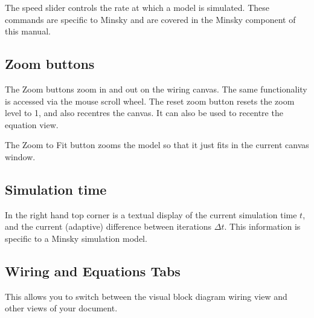 \begin{center}
\end{center}

The speed slider controls the rate at which a model is simulated. These commands are specific to Minsky and are covered in the Minsky component of this manual.

\subsection{Zoom buttons}
\label{ZoomButtons}

\begin{center}
\end{center}

The Zoom buttons zoom in and out on the wiring canvas. The same functionality is accessed via the mouse scroll wheel. The reset zoom button  resets the zoom level to 1, and also recentres the canvas. It can also be used to recentre the equation view.

The Zoom to Fit button zooms the model so that it just fits in the current canvas window.

\subsection{Simulation time}
\label{SimTime}

In the right hand top corner is a textual display of the current simulation time $t$, and the current (adaptive) difference between iterations $\Delta t$. This information is specific to a Minsky simulation model.

\subsection{Wiring and Equations Tabs}
\label{WiringEquationsTab}\label{tabs:wiring}


This allows you to switch between the visual block diagram wiring view and other views of your document.

